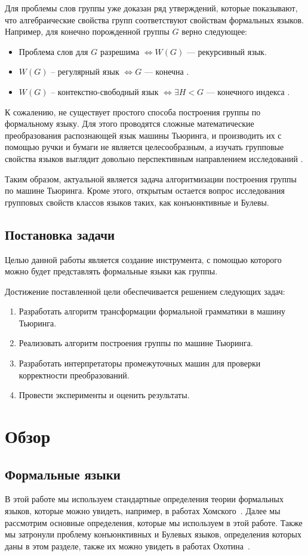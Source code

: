 \documentclass[14pt]{matmex-diploma-custom}
\begin{document}
Для проблемы слов группы уже доказан ряд утверждений, которые показывают, что
алгебраические свойства групп соответствуют свойствам формальных языков. 
Например, для конечно порожденной группы $G$ верно следующее:
\begin{itemize}
    \item Проблема слов для $G$ разрешима $\iff W(G)$ --- рекурсивный язык. 
    \item $W(G)$ -- регулярный язык $\iff G$ --- конечна \cite{Anisimov}.
    \item $W(G)$ -- контекстно-свободный язык $\iff \exists H < G$ --- конечного индекса \cite{Muller}.
\end{itemize}
К сожалению, не существует простого способа построения группы по формальному языку.
Для этого проводятся сложные математические преобразования распознающей язык машины Тьюринга, и
производить их с помощью ручки и бумаги не является целесообразным, а изучать
групповые свойства языков выглядит довольно перспективным направлением исследований \cite{Sapir, SpaceFunc}.

Таким образом, актуальной является задача алгоритмизации построения группы 
по машине Тьюринга. Кроме этого, открытым остается вопрос исследования групповых свойств 
классов языков таких, как конъюнктивные и Булевы.

\subsection*{Постановка задачи}
Целью данной работы является создание инструмента, с помощью которого можно будет 
представлять формальные языки как группы.

Достижение поставленной цели обеспечивается решением следующих задач:
\begin{enumerate}
    \item Разработать алгоритм трансформации формальной грамматики в машину Тьюринга. 
    \item Реализовать алгоритм построения группы по машине Тьюринга.
    \item Разработать интерпретаторы промежуточных машин для проверки корректности преобразований.
    \item Провести эксперименты и оценить результаты.
\end{enumerate}

\section{Обзор}
\subsection{Формальные языки}
В этой работе мы используем стандартные определения теории формальных языков, которые можно увидеть,
например, в работах Хомского~\cite{chomsky1, chomsky2}. 
Далее мы рассмотрим основные определения, которые мы используем в этой работе. 
Также мы затронули проблему конъюнктивных и Булевых языков, 
определения которых даны в этом разделе, также их можно увидеть в работах Охотина~\cite{OKHOTIN201327}.
\end{document}
